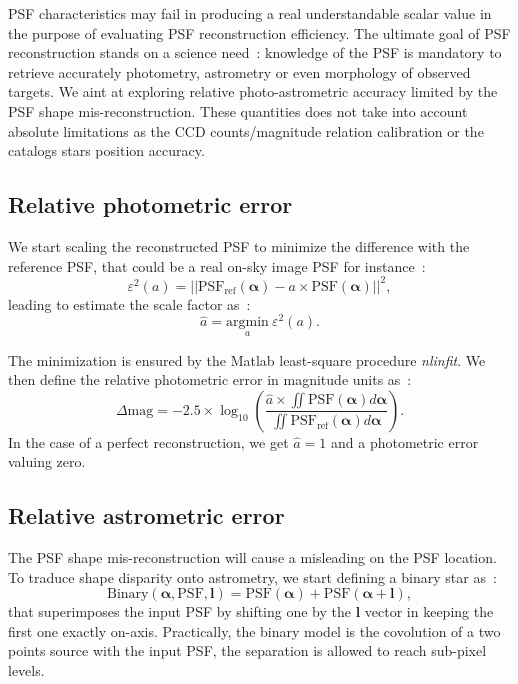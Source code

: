 \documentclass[12pt]{article}
\newcommand{\norme}[1]{\left\vert\left\vert #1 \right\vert\right\vert}
\newcommand{\para}[1]{\left(#1\right)}
\begin{document}
PSF characteristics may fail in producing a real understandable scalar value in the purpose of evaluating PSF reconstruction efficiency. The ultimate goal of PSF reconstruction stands on a science need~: knowledge of the PSF is mandatory to retrieve accurately photometry, astrometry or even morphology of observed targets. We aint at exploring relative photo-astrometric accuracy limited by the PSF shape mis-reconstruction. These quantities does not take into account absolute limitations as the CCD counts/magnitude relation calibration or the catalogs stars position accuracy.

\subsection{Relative photometric error}

We start scaling the reconstructed PSF to minimize the difference with the reference PSF, that could be a real on-sky image PSF for instance~:
\begin{equation}
	\varepsilon^2\para{a} = \norme{\text{PSF}_\text{ref}\para{\boldsymbol{\alpha}} - a\times\text{PSF}\para{\boldsymbol{\alpha}}}^2,
\end{equation}
leading to estimate the scale factor as~:
\begin{equation}
\widehat{a} = \underset{a}{\text{argmin}} \: \varepsilon^2\para{a}.
\end{equation}

The minimization is ensured by the Matlab least-square procedure \emph{nlinfit}. We then define the relative photometric error in magnitude units as~:
\begin{equation}
	\Delta \text{mag} = -2.5\times\log_\text{10}\para{\dfrac{\widehat{a}\times\iint\text{PSF}\para{\boldsymbol{\alpha}}d\boldsymbol{\alpha}}{\iint\text{PSF}_\text{ref}\para{\boldsymbol{\alpha}}d\boldsymbol{\alpha}}}.
\end{equation}
In the case of a perfect reconstruction, we get $\widehat{a} = 1$ and a photometric error valuing zero. 

\subsection{Relative astrometric error}

The PSF shape mis-reconstruction will cause a misleading on the PSF location. To traduce shape disparity onto astrometry, we start defining a binary star as~:
\begin{equation}
\text{Binary}\para{\boldsymbol{\alpha},\text{PSF},\boldsymbol{l}} = \text{PSF}\para{\boldsymbol{\alpha}} + \text{PSF}\para{\boldsymbol{\alpha}+\boldsymbol{l}},
\end{equation}
that superimposes the input PSF by shifting one by the $\boldsymbol{l}$ vector in keeping the first one exactly on-axis. Practically, the binary model is the covolution of a two points source with the input PSF, the separation is allowed to reach sub-pixel levels.
\end{document}
